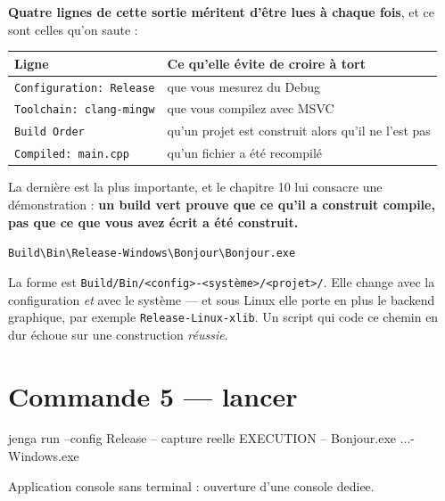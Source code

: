 \begin{nkretenir}
\textbf{Quatre lignes de cette sortie méritent d'être lues à chaque fois}, et ce
sont celles qu'on saute :

\begin{center}
\begin{tabular}{@{}ll@{}}
\toprule
\textbf{Ligne} & \textbf{Ce qu'elle évite de croire à tort} \\
\midrule
\texttt{Configuration: Release} & que vous mesurez du Debug \\
\texttt{Toolchain: clang-mingw} & que vous compilez avec MSVC \\
\texttt{Build Order} & qu'un projet est construit alors qu'il ne l'est pas \\
\texttt{Compiled: main.cpp} & qu'un fichier a été recompilé \\
\bottomrule
\end{tabular}
\end{center}

La dernière est la plus importante, et le chapitre 10 lui consacre une
démonstration : \textbf{un build vert prouve que ce qu'il a construit compile,
pas que ce que vous avez écrit a été construit.}
\end{nkretenir}

\begin{nkretenir}
\texttt{Build\textbackslash Bin\textbackslash Release-Windows\textbackslash Bonjour\textbackslash Bonjour.exe}

La forme est \texttt{Build/Bin/<config>-<système>/<projet>/}. Elle change avec la
configuration \emph{et} avec le système --- et sous Linux elle porte en plus le
backend graphique, par exemple \texttt{Release-Linux-xlib}. Un script qui code ce
chemin en dur échoue sur une construction \emph{réussie}.
\end{nkretenir}

\section{Commande 5 --- lancer}

\begin{nkcode}{jenga run --config Release -- capture reelle}
  EXECUTION  --  Bonjour.exe
     ...\Build\Bin\Release-Windows\Bonjour\Bonjour.exe

Application console sans terminal : ouverture d'une console dediee.
\end{nkcode}

